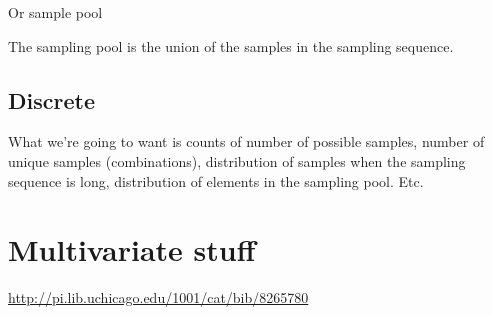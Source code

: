 Or sample pool

The sampling pool is the union of the samples in the sampling sequence.

\section{Discrete}

\begin{remark}
    What we're going to want is counts of number of possible samples,
    number of unique samples (combinations), distribution of samples
    when the sampling sequence is long, distribution of elements in
    the sampling pool.  Etc.
\end{remark}

\chapter{Multivariate stuff}


\href{Exploratory multivariate analysis by example using R}{http://pi.lib.uchicago.edu/1001/cat/bib/8265780}

